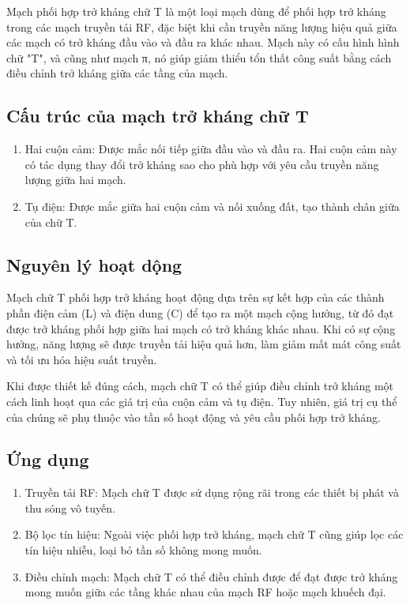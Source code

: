 \documentclass{article}
\begin{document}
Mạch phối hợp trở kháng chữ T là một loại mạch dùng để phối hợp trở kháng trong các mạch truyền tải RF, đặc biệt khi cần truyền năng lượng hiệu quả giữa các mạch có trở kháng đầu vào và đầu ra khác nhau. Mạch này có cấu hình hình chữ "T", và cũng như mạch π, nó giúp giảm thiểu tổn thất công suất bằng cách điều chỉnh trở kháng giữa các tầng của mạch.
\subsection{Cấu trúc của mạch trở kháng chữ T}
\begin{enumerate}
    \item Hai cuộn cảm: Được mắc nối tiếp giữa đầu vào và đầu ra. Hai cuộn cảm này có tác dụng thay đổi trở kháng sao cho phù hợp với yêu cầu truyền năng lượng giữa hai mạch.
    \item Tụ điện: Được mắc giữa hai cuộn cảm và nối xuống đất, tạo thành chân giữa của chữ T.
\end{enumerate}
\subsection{Nguyên lý hoạt dộng}
Mạch chữ T phối hợp trở kháng hoạt động dựa trên sự kết hợp của các thành phần điện cảm (L) và điện dung (C) để tạo ra một mạch cộng hưởng, từ đó đạt được trở kháng phối hợp giữa hai mạch có trở kháng khác nhau. Khi có sự cộng hưởng, năng lượng sẽ được truyền tải hiệu quả hơn, làm giảm mất mát công suất và tối ưu hóa hiệu suất truyền.

Khi được thiết kế đúng cách, mạch chữ T có thể giúp điều chỉnh trở kháng một cách linh hoạt qua các giá trị của cuộn cảm và tụ điện. Tuy nhiên, giá trị cụ thể của chúng sẽ phụ thuộc vào tần số hoạt động và yêu cầu phối hợp trở kháng.
\subsection{Ứng dụng }
\begin{enumerate}
    \item Truyền tải RF: Mạch chữ T được sử dụng rộng rãi trong các thiết bị phát và thu sóng vô tuyến.
    \item Bộ lọc tín hiệu: Ngoài việc phối hợp trở kháng, mạch chữ T cũng giúp lọc các tín hiệu nhiễu, loại bỏ tần số không mong muốn.
    \item Điều chỉnh mạch: Mạch chữ T có thể điều chỉnh được để đạt được trở kháng mong muốn giữa các tầng khác nhau của mạch RF hoặc mạch khuếch đại.
\end{enumerate}
\end{document}
